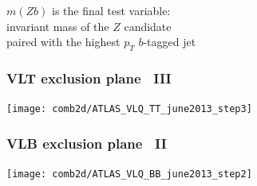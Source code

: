 \documentclass[xcolor=dvipsnames,10pt]{beamer}
\begin{document}
\begin{frame}
\begin{minipage}{.4\textwidth}
$m(Zb)$ is the final test variable:\\
invariant mass of the $Z$ candidate\\
paired with the highest $p_T$ $b$-tagged jet

\end{minipage}

\end{frame}


\begin{frame}\frametitle{VLT exclusion plane~\cite{combination} III}
\footnotesize\centering

\texttt{[image: comb2d/ATLAS\_VLQ\_TT\_june2013\_step3]}

\end{frame}


\begin{frame}\frametitle{VLB exclusion plane~\cite{combination} II}
\footnotesize\centering

\texttt{[image: comb2d/ATLAS\_VLQ\_BB\_june2013\_step2]}

\end{frame}



\end{document}
